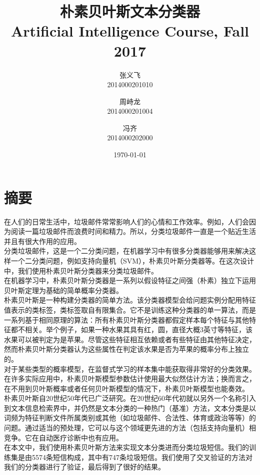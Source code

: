 \documentclass[a4paper, twocolumn, 12pt]{article}
\title{\huge {朴素贝叶斯文本分类器}\\[1ex]\small Artificial Intelligence Course, Fall 2017}
\author{
    张义飞\\2014000201010
    \and 周峙龙\\2014000201004
    \and 冯齐\\2014000202000
}
\date{\today}
\begin{document}
\maketitle

\section{摘要}

在人们的日常生活中，垃圾邮件常常影响人们的心情和工作效率。例如，人们会因为阅读一篇垃圾邮件而浪费时间和精力。所以，分类垃圾邮件一直是一个贴近生活并且有很大作用的应用。\\

分类垃圾邮件，这是一个二分类问题，在机器学习中有很多分类器能够用来解决这样一个二分类问题，例如支持向量机（SVM），朴素贝叶斯分类器等。在这次设计中，我们使用朴素贝叶斯分类器来分类垃圾邮件。\\

在机器学习中，朴素贝叶斯分类器是一系列以假设特征之间强（朴素）独立下运用贝叶斯定理为基础的简单概率分类器。\\

朴素贝叶斯是一种构建分类器的简单方法。该分类器模型会给问题实例分配用特征值表示的类标签，类标签取自有限集合。它不是训练这种分类器的单一算法，而是一系列基于相同原理的算法：所有朴素贝叶斯分类器都假定样本每个特征与其他特征都不相关。举个例子，如果一种水果其具有红，圆，直径大概3英寸等特征，该水果可以被判定为是苹果。尽管这些特征相互依赖或者有些特征由其他特征决定，然而朴素贝叶斯分类器认为这些属性在判定该水果是否为苹果的概率分布上独立的。\\

对于某些类型的概率模型，在监督式学习的样本集中能获取得非常好的分类效果。在许多实际应用中，朴素贝叶斯模型参数估计使用最大似然估计方法；换而言之，在不用到贝叶斯概率或者任何贝叶斯模型的情况下，朴素贝叶斯模型也能奏效。\\

朴素贝叶斯自20世纪50年代已广泛研究。在20世纪60年代初就以另外一个名称引入到文本信息检索界中，并仍然是文本分类的一种热门（基准）方法，文本分类是以词频为特征判断文件所属类别或其他（如垃圾邮件、合法性、体育或政治等等）的问题。通过适当的预处理，它可以与这个领域更先进的方法（包括支持向量机）相竞争。它在自动医疗诊断中也有应用。\\

在本文中，我们使用朴素贝叶斯方法来实现文本分类进而分类垃圾短信。我们的训练集是由5574条短信构成，其中有747条垃圾短信。我们使用了交叉验证的方法对我们的分类器进行了验证，最后得到了很好的结果。\\
\end{document}
